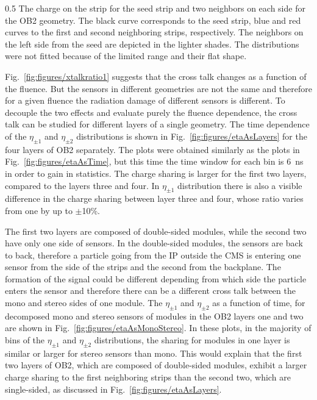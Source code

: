                  {0.5}       %
                 { The charge on the strip for the seed strip and two neighbors on each side for the OB2 geometry. The black curve corresponds to the seed strip, blue and red curves to the first and second neighboring strips, respectively. The neighbors on the left side from the seed are depicted in the lighter shades. The distributions were not fitted because of the limited range and their flat shape.}

Fig.~\ref{fig:figures/xtalkratio1} suggests that the cross talk changes as a function of the fluence. But the sensors in different geometries are not the same and therefore for a given fluence the radiation damage of different sensors is different. To decouple the two effects and evaluate purely the fluence dependence, the cross talk can be studied for different layers of a single geometry. The time dependence of the $\eta_{\pm 1}$ and $\eta_{\pm 2}$ distributions is shown in Fig.~\ref{fig:figures/etaAsLayers} for the four layers of OB2 separately. The plots were obtained similarly as the plots in Fig.~\ref{fig:figures/etaAsTime}, but this time the time window for each bin is 6~ns in order to gain in statistics. The charge sharing is larger for the first two layers, compared to the layers three and four. In  $\eta_{\pm 1}$ distribution there is also a visible difference in the charge sharing between layer three and four, whose ratio varies from one by up to $\pm$10\%. 

The first two layers are composed of double-sided modules, while the second two have only one side of sensors. In the double-sided modules, the sensors are back to back, therefore a particle going from the IP outside the CMS is entering one sensor from the side of the strips and the second from the backplane. The formation of the signal could be different depending from which side the particle enters the sensor and therefore there can be a different cross talk between the mono and stereo sides of one module. The $\eta_{\pm 1}$ and $\eta_{\pm 2}$ as a function of time, for decomposed mono and stereo sensors of modules in the OB2 layers one and two are shown in Fig.~\ref{fig:figures/etaAsMonoStereo}. In these plots, in the majority of bins of the $\eta_{\pm 1}$ and $\eta_{\pm 2}$  distributions, the sharing for modules in one layer is similar or larger for stereo sensors than mono. This would explain that the first two layers of OB2, which are composed of double-sided modules, exhibit a larger charge sharing to the first neighboring strips than the second two, which are single-sided, as discussed in Fig.~\ref{fig:figures/etaAsLayers}. 

